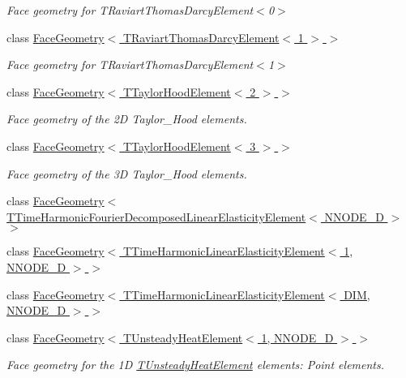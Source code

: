 \begin{DoxyCompactItemize}
\begin{DoxyCompactList}\small\item\em Face geometry for T\+Raviart\+Thomas\+Darcy\+Element$<$0$>$ \end{DoxyCompactList}\item 
class \hyperlink{classoomph_1_1FaceGeometry_3_01TRaviartThomasDarcyElement_3_011_01_4_01_4}{Face\+Geometry$<$ T\+Raviart\+Thomas\+Darcy\+Element$<$ 1 $>$ $>$}
\begin{DoxyCompactList}\small\item\em Face geometry for T\+Raviart\+Thomas\+Darcy\+Element$<$1$>$ \end{DoxyCompactList}\item 
class \hyperlink{classoomph_1_1FaceGeometry_3_01TTaylorHoodElement_3_012_01_4_01_4}{Face\+Geometry$<$ T\+Taylor\+Hood\+Element$<$ 2 $>$ $>$}
\begin{DoxyCompactList}\small\item\em Face geometry of the 2D Taylor\+\_\+\+Hood elements. \end{DoxyCompactList}\item 
class \hyperlink{classoomph_1_1FaceGeometry_3_01TTaylorHoodElement_3_013_01_4_01_4}{Face\+Geometry$<$ T\+Taylor\+Hood\+Element$<$ 3 $>$ $>$}
\begin{DoxyCompactList}\small\item\em Face geometry of the 3D Taylor\+\_\+\+Hood elements. \end{DoxyCompactList}\item 
class \hyperlink{classoomph_1_1FaceGeometry_3_01TTimeHarmonicFourierDecomposedLinearElasticityElement_3_01NNODE__1D_01_4_01_4}{Face\+Geometry$<$ T\+Time\+Harmonic\+Fourier\+Decomposed\+Linear\+Elasticity\+Element$<$ N\+N\+O\+D\+E\+\_\+D $>$ $>$}
\item 
class \hyperlink{classoomph_1_1FaceGeometry_3_01TTimeHarmonicLinearElasticityElement_3_011_00_01NNODE__1D_01_4_01_4}{Face\+Geometry$<$ T\+Time\+Harmonic\+Linear\+Elasticity\+Element$<$ 1, N\+N\+O\+D\+E\+\_\+D $>$ $>$}
\item 
class \hyperlink{classoomph_1_1FaceGeometry_3_01TTimeHarmonicLinearElasticityElement_3_01DIM_00_01NNODE__1D_01_4_01_4}{Face\+Geometry$<$ T\+Time\+Harmonic\+Linear\+Elasticity\+Element$<$ D\+I\+M, N\+N\+O\+D\+E\+\_\+D $>$ $>$}
\item 
class \hyperlink{classoomph_1_1FaceGeometry_3_01TUnsteadyHeatElement_3_011_00_01NNODE__1D_01_4_01_4}{Face\+Geometry$<$ T\+Unsteady\+Heat\+Element$<$ 1, N\+N\+O\+D\+E\+\_\+D $>$ $>$}
\begin{DoxyCompactList}\small\item\em Face geometry for the 1D \hyperlink{classoomph_1_1TUnsteadyHeatElement}{T\+Unsteady\+Heat\+Element} elements\+: Point elements. \end{DoxyCompactList}\item 

\end{DoxyCompactItemize}
